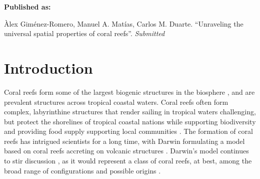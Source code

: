 \vspace{3cm}





\textbf{Published as:}

\vspace{0.5cm}

\begin{center}
    Àlex Giménez-Romero, Manuel A. Matías, Carlos M. Duarte. ``Unraveling the
    universal spatial properties of coral reefs''. \textit{Submitted}
\end{center}


\newpage
\section{Introduction}

Coral reefs form some of the largest biogenic structures in the biosphere
\cite{wiener2021exploration}, and are prevalent structures across tropical
coastal waters. Coral reefs often form complex, labyrinthine structures that
render sailing in tropical waters challenging, but protect the shorelines of
tropical coastal nations while supporting biodiversity and providing food
supply supporting local communities \cite{Moberg1999}. The formation of coral
reefs has intrigued scientists for a long time, with Darwin formulating a model
based on coral reefs accreting on volcanic structures
\cite{darwin1874structure}. Darwin's model continues to stir discussion
\cite{Droxler2021}, as it would represent a class of coral reefs, at best,
among the broad range of configurations and possible origins
\cite{Scoffin1983}.

